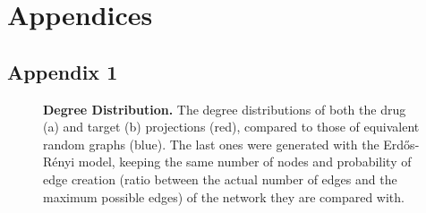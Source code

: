 \part{Appendices}



\begingroup

\begin{appendices}
\appendix

\chapter{Appendix 1}
    \begin{figure}[!htb]
        \centering
        \caption[Degree Distribution]{\textbf{Degree Distribution.} The degree distributions of both the drug (a) and target (b) projections (red), compared to those of equivalent random graphs (blue). The last ones were generated with the Erdős-Rényi model\autocite{Erds1959}, keeping the same number of nodes and probability of edge creation (ratio between the actual number of edges and the maximum possible edges) of the network they are compared with.}
        \label{fig:SI_degree_distribution}

\end{figure}
\end{appendices}
